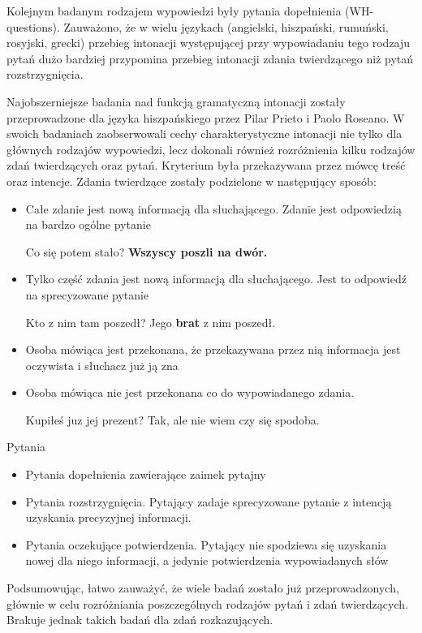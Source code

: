 \documentclass[a4paper,12 pt]{article}
\begin{document}
\leavevmode
\newline
Kolejnym badanym rodzajem wypowiedzi były pytania dopełnienia (WH-questions). Zauważono, że w wielu językach (angielski, hiszpański, rumuński, rosyjski, grecki) przebieg intonacji występującej przy wypowiadaniu tego rodzaju pytań dużo bardziej przypomina przebieg intonacji zdania twierdzącego niż pytań rozstrzygnięcia.
\newline


Najobszerniejsze badania nad funkcją gramatyczną intonacji zostały przeprowadzone dla języka hiszpańskiego przez Pilar Prieto i Paolo Roseano. W swoich badaniach zaobserwowali cechy charakterystyczne intonacji nie tylko dla głównych rodzajów wypowiedzi, lecz dokonali również rozróżnienia kilku rodzajów zdań twierdzących oraz pytań. Kryterium była przekazywana przez mówcę treść oraz intencje.
\newline
Zdania twierdzące zostały podzielone w następujący sposób:
\begin{itemize}
\item{Całe zdanie jest nową informacją dla słuchającego. Zdanie jest odpowiedzią na bardzo ogólne pytanie}
\begin{exe}
\ex Co się potem stało?
\newline
\textbf{Wszyscy poszli na dwór.}
\end{exe}
\item{Tylko część zdania jest nową informacją dla słuchającego. Jest to odpowiedź na sprecyzowane pytanie}
\begin{exe}
\ex Kto z nim tam poszedł?
\newline
Jego \textbf{brat} z nim poszedł.
\end{exe}

\item{Osoba mówiąca jest przekonana, że przekazywana przez nią informacja jest oczywista i słuchacz już ją zna}
\item{Osoba mówiąca nie jest przekonana co do wypowiadanego zdania.}
\begin{exe}
\ex Kupiłeś juz jej prezent?
\newline
Tak, ale nie wiem czy się spodoba.
\end{exe}

\end{itemize}
Pytania
\begin{itemize}
\item{Pytania dopełnienia zawierające zaimek pytajny}
\item{Pytania rozstrzygnięcia. Pytający zadaje sprecyzowane pytanie z intencją uzyskania precyzyjnej informacji.}
\item{Pytania oczekujące potwierdzenia. Pytający nie spodziewa się uzyskania nowej dla niego informacji, a jedynie potwierdzenia wypowiadanych słów}
\end{itemize}
Podsumowując, łatwo zauważyć, że wiele badań zostało już przeprowadzonych, głównie w celu rozróżniania poszczególnych rodzajów pytań i zdań twierdzących. Brakuje jednak takich badań dla zdań rozkazujących.
\end{document}
